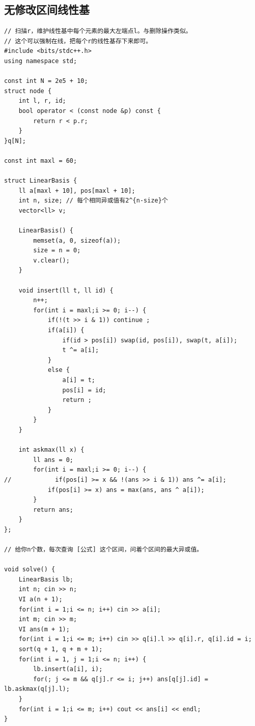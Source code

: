 \documentclass[twoside]{article}
\begin{document}
\subsection{无修改区间线性基}
\begin{lstlisting}
// 扫描r，维护线性基中每个元素的最大左端点l。与删除操作类似。
// 这个可以强制在线，把每个r的线性基存下来即可。
#include <bits/stdc++.h>
using namespace std;

const int N = 2e5 + 10;
struct node {
    int l, r, id;
    bool operator < (const node &p) const {
        return r < p.r;
    }
}q[N];

const int maxl = 60;

struct LinearBasis {
    ll a[maxl + 10], pos[maxl + 10];
    int n, size; // 每个相同异或值有2^{n-size}个
    vector<ll> v;

    LinearBasis() {
        memset(a, 0, sizeof(a));
        size = n = 0;
        v.clear();
    }

    void insert(ll t, ll id) {
        n++;
        for(int i = maxl;i >= 0; i--) {
            if(!(t >> i & 1)) continue ;
            if(a[i]) {
                if(id > pos[i]) swap(id, pos[i]), swap(t, a[i]);
                t ^= a[i];
            }
            else {
                a[i] = t;
                pos[i] = id;
                return ;
            }
        }
    }

    int askmax(ll x) {
        ll ans = 0;
        for(int i = maxl;i >= 0; i--) {
//            if(pos[i] >= x && !(ans >> i & 1)) ans ^= a[i];
            if(pos[i] >= x) ans = max(ans, ans ^ a[i]);
        }
        return ans;
    }
};

// 给你n个数，每次查询 [公式] 这个区间，问着个区间的最大异或值。

void solve() {
    LinearBasis lb;
    int n; cin >> n;
    VI a(n + 1);
    for(int i = 1;i <= n; i++) cin >> a[i];
    int m; cin >> m;
    VI ans(m + 1);
    for(int i = 1;i <= m; i++) cin >> q[i].l >> q[i].r, q[i].id = i;
    sort(q + 1, q + m + 1);
    for(int i = 1, j = 1;i <= n; i++) {
        lb.insert(a[i], i);
        for(; j <= m && q[j].r <= i; j++) ans[q[j].id] = lb.askmax(q[j].l);
    }
    for(int i = 1;i <= m; i++) cout << ans[i] << endl;
}
\end{lstlisting}
\end{document}
